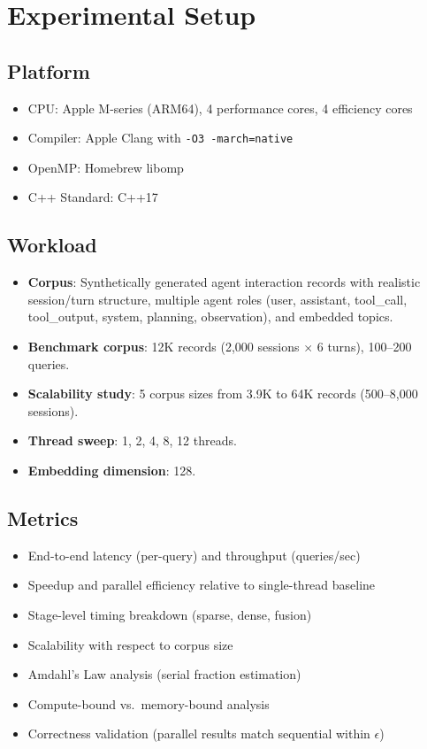 \documentclass[11pt]{article}
\begin{document}
\section{Experimental Setup}

\subsection{Platform}
\begin{itemize}[nosep]
    \item CPU: Apple M-series (ARM64), 4 performance cores, 4 efficiency cores
    \item Compiler: Apple Clang with \texttt{-O3 -march=native}
    \item OpenMP: Homebrew libomp
    \item C++ Standard: C++17
\end{itemize}

\subsection{Workload}
\begin{itemize}[nosep]
    \item \textbf{Corpus}: Synthetically generated agent interaction records with realistic session/turn structure, multiple agent roles (user, assistant, tool\_call, tool\_output, system, planning, observation), and embedded topics.
    \item \textbf{Benchmark corpus}: 12K records (2,000 sessions $\times$ 6 turns), 100--200 queries.
    \item \textbf{Scalability study}: 5 corpus sizes from 3.9K to 64K records (500--8,000 sessions).
    \item \textbf{Thread sweep}: 1, 2, 4, 8, 12 threads.
    \item \textbf{Embedding dimension}: 128.
\end{itemize}

\subsection{Metrics}
\begin{itemize}[nosep]
    \item End-to-end latency (per-query) and throughput (queries/sec)
    \item Speedup and parallel efficiency relative to single-thread baseline
    \item Stage-level timing breakdown (sparse, dense, fusion)
    \item Scalability with respect to corpus size
    \item Amdahl's Law analysis (serial fraction estimation)
    \item Compute-bound vs.\ memory-bound analysis
    \item Correctness validation (parallel results match sequential within $\epsilon$)
\end{itemize}
\end{document}
